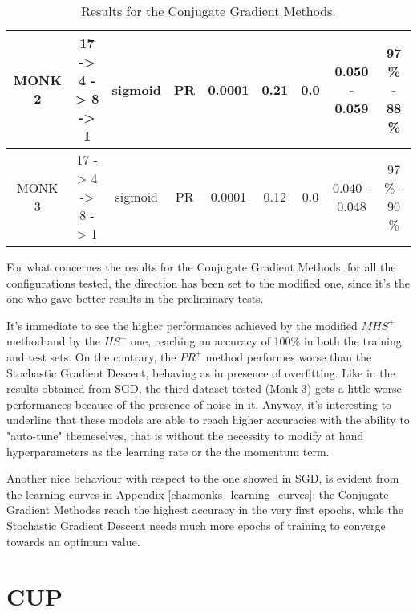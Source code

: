 \begin{table}[H]
\begin{subtable}{\textwidth}
{\begin{tabular}{| c | c | c | c | c | c | c | c | c |}
                            \hline
                            MONK 2 & 17 -> 4 -> 8 -> 1 & sigmoid & PR & 0.0001 & 0.21 & 0.0
                            & 0.050 - 0.059 & 97 \% - 88 \% \\
                            \hline
                            MONK 3 & 17 -> 4 -> 8 -> 1 & sigmoid & PR & 0.0001 & 0.12 & 0.0
                            & 0.040 - 0.048 & 97 \% - 90 \% \\
                            \hline
                        \end{tabular}
                    }
                \end{subtable}
                \caption{Results for the Conjugate Gradient Methods.}
                \label{tab:monks_cgd}
        \end{table}

        For what concernes the results for the Conjugate Gradient Methods, for all the configurations tested,
        the direction has been set to the modified one, since it's the one who gave better results in the preliminary tests.

        It's immediate to see the higher performances achieved by the modified $MHS^+$ method and by the $HS^+$ one, reaching an accuracy of 100\% in both
        the training and test sets. On the contrary, the $PR^+$ method performes worse than the Stochastic
        Gradient Descent, behaving as in presence of overfitting. Like in the results obtained from SGD, the third dataset tested (Monk 3) gets a little worse performances because of the presence of noise in it.
        Anyway, it's interesting to underline that these models are able to reach higher accuracies with the
        ability to "auto-tune" themeselves, that is without the necessity to modify at hand hyperparameters as the learning rate or the the momentum term.

        Another nice behaviour with respect to the one showed in SGD, is evident from the learning curves in Appendix \ref{cha:monks_learning_curves}: the Conjugate Gradient Methodss reach the highest accuracy in the very first epochs, while the Stochastic Gradient Descent needs much more epochs of training to converge towards an optimum value.


    \section{CUP} %
        \label{sec:cup}
    
